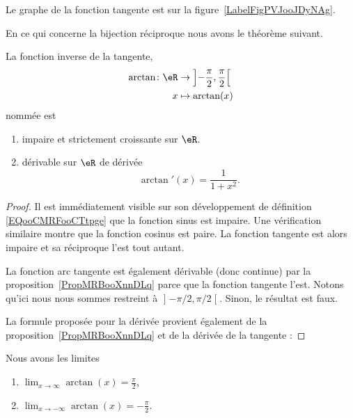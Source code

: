 	Le graphe de la fonction tangente est sur la figure~\ref{LabelFigPVJooJDyNAg}. %
	\newcommand{\CaptionFigPVJooJDyNAg}{Le graphe de la fonction tangente.}
	

	En ce qui concerne la bijection réciproque nous avons le théorème suivant.
	\begin{theorem}     \label{THOooUSVGooOAnCvC}
		La fonction inverse de la tangente,
		\begin{equation}
			\begin{aligned}
				\arctan\colon \eR & \to \left] -\frac{ \pi }{2} , \frac{ \pi }{2} \right[ \\
				x                 & \mapsto \arctan(x)
			\end{aligned}
		\end{equation}
		nommée  est
		\begin{enumerate}
			\item
			      impaire et strictement croissante sur \( \eR\).
			\item       \label{ITEMooMNHLooOVhIIb}
			      dérivable sur \( \eR\) de dérivée
			      \begin{equation}        \label{EQooGCHGooPlwYWt}
				      \arctan'(x)=\frac{1}{ 1+x^2 }.
			      \end{equation}
		\end{enumerate}
	\end{theorem}

	\begin{proof}
		Il est immédiatement visible sur son développement de définition \eqref{EQooCMRFooCTtpge} que la fonction sinus est impaire. Une vérification similaire montre que la fonction cosinus est paire. La fonction tangente est alors impaire et sa réciproque l'est tout autant.

		La fonction arc tangente est également dérivable (donc continue) par la proposition~\ref{PropMRBooXnnDLq} parce que la fonction tangente l'est. Notons qu'ici nous nous sommes restreint à \( \mathopen] -\pi/2 , \pi/2 \mathclose[\). Sinon, le résultat est faux.

		La formule proposée pour la dérivée provient également de la proposition~\ref{PropMRBooXnnDLq} et de la dérivée de la tangente :
	\end{proof}

	\begin{lemma}       \label{LEMooHRDCooGtnyeQ}
		Nous avons les limites
		\begin{enumerate}
			\item
			      \( \lim_{x\to \infty} \arctan(x)=\frac{ \pi }{2}\),
			\item
			      \( \lim_{x\to -\infty} \arctan(x)=-\frac{ \pi }{2}\).
		\end{enumerate}
	\end{lemma}

